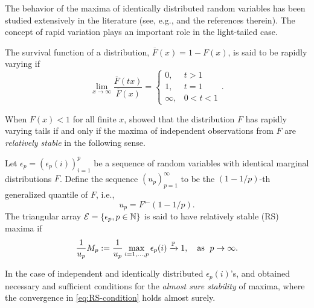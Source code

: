 
The behavior of the maxima of identically distributed random variables has been studied extensively in the literature (see, e.g., \cite{leadbetter2012extremes,resnick2013extreme,embrechts2013modelling,de2007extreme} 
and the references therein). 
The concept of rapid variation plays an important role in the light-tailed case.

\begin{definition} \label{def:rapid-variation}
The survival function of a distribution, $\overline{F}(x) = 1 - F(x)$, is said to be rapidly varying if
\begin{equation}\label{e:def:rapid-variation}
\lim_{x\to\infty} \frac{\overline{F}(tx)}{\overline{F}(x)} 
    = \begin{cases}
    0, & t > 1\\
    1, & t = 1\\
    \infty, & 0 < t < 1
\end{cases}.
\end{equation}
\end{definition}

When $F(x)<1$ for all finite $x$, \citet{gnedenko1943distribution} showed that the distribution $F$ has rapidly varying tails if and only if the maxima of independent observations from $F$ are \emph{relatively stable} in the following sense.
\begin{definition} \label{def:RS}
Let $\epsilon_p = \left(\epsilon_p(i)\right)_{i=1}^p$ be a sequence of random variables with identical marginal distributions $F$. 
Define the sequence $(u_p)_{p=1}^\infty$ to be the $(1-1/p)$-th generalized quantile of $F$, i.e., 
\begin{equation} \label{eq:quantiles}
    u_p = F^\leftarrow(1 - 1/p).
\end{equation}
The triangular array ${\cal E} = \{\epsilon_p, p\in\N\}$ is said to have relatively stable (RS) maxima if
\begin{equation} \label{eq:RS-condition}
    \frac{1}{u_{p}} M_p := \frac{1}{u_{p}} \max_{i=1,\ldots,p} \epsilon_p(i) \xrightarrow{\P} 1,\quad \text{as }\;p\to\infty.
\end{equation}
\end{definition}

In the case of independent and identically distributed $\epsilon_p(i)$'s, \citet{barndorff1963limit} and \citet{resnick1973almost} obtained necessary and sufficient conditions for the \emph{almost sure stability} of maxima, where the convergence in \eqref{eq:RS-condition} holds almost surely.

